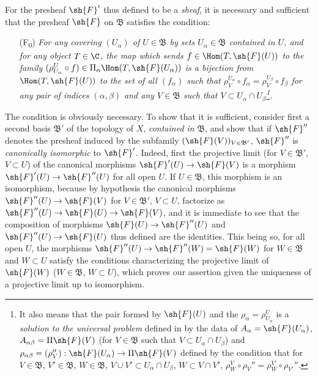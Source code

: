 \begin{env}[3.2.2]
\label{0.3.2.2}
For the presheaf $\sh{F}'$ thus defined to be a \emph{sheaf}, it is necessary
and sufficient that the presheaf $\sh{F}$ on $\mathfrak{B}$ satisfies the
condition:
\begin{enumerate}
  \item[(F\textsubscript{0})] \emph{For any covering $(U_\alpha)$ of $U\in\mathfrak{B}$ by sets
        $U_\alpha\in\mathfrak{B}$ contained in $U$, and for any object $T\in\C$,
        the map which sends $f\in\Hom(T,\sh{F}(U))$ to the family
        $(\rho_{U_\alpha}^U\circ f)\in\Pi_\alpha\Hom(T,\sh{F}(U_\alpha))$ is a
        bijection from $\Hom(T,\sh{F}(U))$ to the set of all $(f_\alpha)$ such
        that $\rho_V^{U_\alpha}\circ f_\alpha=\rho_V^{U_\beta}\circ f_\beta$ for
        any pair of indices $(\alpha,\beta)$ and any $V\in\mathfrak{B}$ such
        that $V\subset U_\alpha\cap U_\beta$\footnote{It also means that the
        pair formed by $\sh{F}(U)$ and the $\rho_\alpha=\rho_{U_\alpha}^U$ is a
        \emph{solution to the universal problem} defined in  by
        the data of $A_\alpha=\sh{F}(U_\alpha)$, $A_{\alpha\beta}=\Pi\sh{F}(V)$
        (for $V\in\mathfrak{B}$ such that $V\subset U_\alpha\cap U_\beta$) and
        $\rho_{\alpha\beta}=(\rho_V''):\sh{F}(U_\alpha)\to\Pi\sh{F}(V)$ defined
        by the condition that for $V\in\mathfrak{B}$, $V'\in\mathfrak{B}$,
        $W\in\mathfrak{B}$, $V\cup V'\subset U_\alpha\cap U_\beta$,
        $W\subset V\cap V'$,
        $\rho_W^V\circ\rho_V''=\rho_W^{V'}\circ\rho_{V'}''$.}.}
\end{enumerate}

The condition is obviously necessary. To show that it is sufficient, consider
first a second basis $\mathfrak{B}'$ of the topology of $X$, \emph{contained in}
$\mathfrak{B}$, and show that if $\sh{F}''$ denotes the presheaf induced by the
subfamily $(\sh{F}(V))_{V\in\mathfrak{B}'}$, $\sh{F}''$ is \emph{canonically
isomorphic} to $\sh{F}'$. Indeed, first the projective limit (for
$V\in\mathfrak{B}'$, $V\subset U$) of the canonical morphisms
$\sh{F}'(U)\to\sh{F}(V)$ is a morphism $\sh{F}'(U)\to\sh{F}''(U)$ for all open
$U$. If $U\in\mathfrak{B}$, this morphism is an isomorphism, because by
hypothesis the canonical morphisms $\sh{F}''(U)\to\sh{F}(V)$ for
$V\in\mathfrak{B}'$, $V\subset U$, factorize as
$\sh{F}''(U)\to\sh{F}(U)\to\sh{F}(V)$, and it is immediate to see that the
composition of morphisms $\sh{F}(U)\to\sh{F}''(U)$ and $\sh{F}''(U)\to\sh{F}(U)$
thus defined are the identities. This being so, for all open $U$, the morphisms
$\sh{F}''(U)\to\sh{F}''(W)=\sh{F}(W)$ for $W\in\mathfrak{B}$ and $W\subset U$
satisfy the conditions characterizing the projective limit of $\sh{F}(W)$
($W\in\mathfrak{B}$, $W\subset U$), which proves our assertion given the
uniqueness of a projective limit up to isomorphism.


\end{env}
